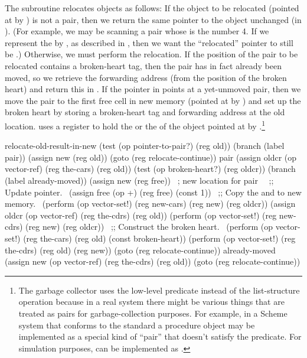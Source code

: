 \noindent
The subroutine  relocates objects as follows:
If the object to be relocated (pointed at by ) is not a pair, then we
return the same pointer to the object unchanged (in ).  (For example,
we may be scanning a pair whose  is the number 4.  If we represent
the  by , as described in , then we want
the ``relocated''  pointer to still be .)  Otherwise, we
must perform the relocation.  If the  position of the pair to be
relocated contains a broken-heart tag, then the pair has in fact already been
moved, so we retrieve the forwarding address (from the  position of
the broken heart) and return this in .  If the pointer in 
points at a yet-unmoved pair, then we move the pair to the first free cell in
new memory (pointed at by ) and set up the broken heart by storing a
broken-heart tag and forwarding address at the old location.
 uses a register  to hold the
 or the  of the object pointed at by
.\footnote{The garbage collector uses the low-level predicate
 instead of the list-structure   operation
because in a real system there might be various things that are treated as
pairs for garbage-collection purposes.  For example, in a Scheme system that
conforms to the  standard a procedure object may be implemented
as a special kind of ``pair'' that doesn't satisfy the  predicate.
For simulation purposes,  can be implemented as
.}

\begin{codeBlock}
relocate-old-result-in-new
  (test (op pointer-to-pair?) (reg old))
  (branch (label pair))
  (assign new (reg old))
  (goto (reg relocate-continue))
pair
  (assign oldcr
          (op vector-ref)
          (reg the-cars)
          (reg old))
  (test (op broken-heart?) (reg oldcr))
  (branch (label already-moved))
  (assign new (reg free)) ~\textrm{; new location for pair}~
  ~\textrm{;; Update  pointer.}~
  (assign free (op +) (reg free) (const 1))
  ~\textrm{;; Copy the  and  to new memory.}~
  (perform (op vector-set!)
           (reg new-cars)
           (reg new)
           (reg oldcr))
  (assign oldcr
          (op vector-ref)
          (reg the-cdrs)
          (reg old))
  (perform (op vector-set!)
           (reg new-cdrs)
           (reg new)
           (reg oldcr))
  ~\textrm{;; Construct the broken heart.}~
  (perform (op vector-set!)
           (reg the-cars)
           (reg old)
           (const broken-heart))
  (perform (op vector-set!)
           (reg the-cdrs)
           (reg old)
           (reg new))
  (goto (reg relocate-continue))
already-moved
  (assign new
          (op vector-ref)
          (reg the-cdrs)
          (reg old))
  (goto (reg relocate-continue))
\end{codeBlock}

